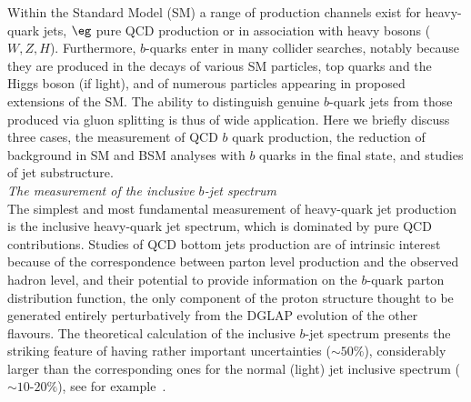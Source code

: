 Within the Standard Model (SM) a range of production channels exist for
heavy-quark jets, $\eg$ pure QCD production or in association with heavy bosons
($W, Z, H$). Furthermore, $b$-quarks enter in many collider searches, notably
because they are produced in the decays of various SM particles, \eg top
quarks and the Higgs boson (if light), and of numerous particles appearing
in proposed extensions of the SM. The ability to distinguish genuine $b$-quark jets from those produced via gluon splitting is thus of wide application. Here we briefly discuss three cases, the measurement of QCD $b$ quark production, the reduction of background in SM and BSM analyses with $b$ quarks in the final state, and studies of jet substructure.%
%
\\[5mm]
{\em The measurement of the inclusive $b$-jet spectrum}
\\[5mm]
The simplest and most fundamental measurement of heavy-quark jet production is
the inclusive heavy-quark jet spectrum, which is dominated by pure QCD
contributions.  Studies of QCD bottom jets production are of intrinsic interest
because of the correspondence between parton level production and the observed
hadron level, and their potential to provide information on the $b$-quark
parton distribution function, the only component of the proton structure
thought to be generated entirely perturbatively from the DGLAP evolution of the
other flavours.  The theoretical calculation of the inclusive
$b$-jet spectrum presents the striking feature of having rather important uncertainties ($\sim 50\%$), considerably larger than the
corresponding ones for the normal (light) jet inclusive spectrum ($\sim
10$-$20\%$), see for example~\cite{Frixione:1996nh}.  

